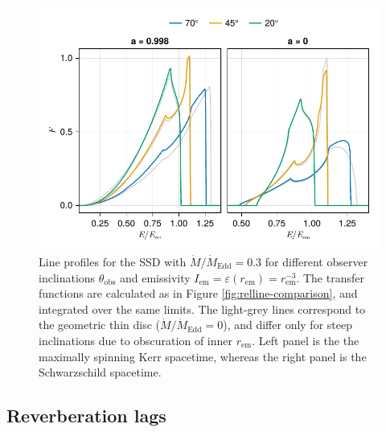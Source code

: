 \documentclass[fleqn,usenatbib]{mnras}
\begin{document}
\begin{figure}
	\centering
	\includegraphics[width=0.99\linewidth]{figures/lineprofiles.ssd.pdf}
	\caption{Line profiles for the SSD with $\dot{M} / \dot{M}_\text{Edd} = 0.3$ for different observer inclinations $\theta_\text{obs}$ and emissivity $I_\text{em} = \varepsilon(r_\text{em}) = r_\text{em}^{-3}$. The transfer functions are calculated as in Figure \ref{fig:relline-comparison}, and integrated over the same limits. The light-grey lines correspond to the geometric thin disc ($\dot{M} / \dot{M}_\text{Edd} = 0$), and differ only for steep inclinations due to obscuration of inner $r_\text{em}$. Left panel is the the maximally spinning Kerr spacetime, whereas the right panel is the Schwarzschild spacetime.}
	\label{fig:line-profile-ssd}
\end{figure}


\subsection{Reverberation lags}
\label{sec:lag-transfer-functions}

\citep{reynolds_x-ray_1999,wilkins_origin_2013,cackett_modelling_2014}

\end{document}

